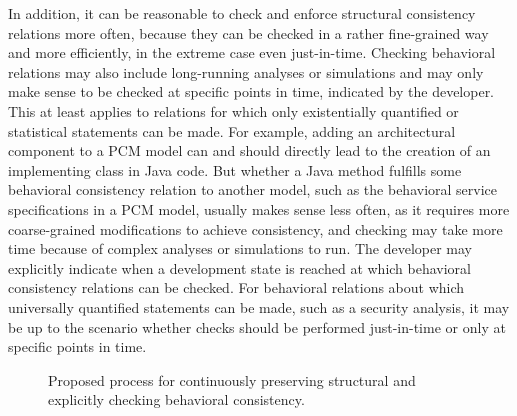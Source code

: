 In addition, it can be reasonable to check and enforce structural consistency relations more often, because they can be checked in a rather fine-grained way and more efficiently, in the extreme case even just-in-time.
Checking behavioral relations may also include long-running analyses or simulations and may only make sense to be checked at specific points in time, indicated by the developer.
This at least applies to relations for which only existentially quantified or statistical statements can be made.
For example, adding an architectural component to a \gls{PCM} model can and should directly lead to the creation of an implementing class in Java code. %
But whether a Java method fulfills some behavioral consistency relation to another model, such as the behavioral service specifications in a \gls{PCM} model, usually makes sense less often, as it requires more coarse-grained modifications to achieve consistency, and checking may take more time because of complex analyses or simulations to run.
The developer may explicitly indicate when a development state is reached at which behavioral consistency relations can be checked.
For behavioral relations about which universally quantified statements can be made, such as a security analysis, it may be up to the scenario whether checks should be performed just-in-time or only at specific points in time.

\begin{figure}
    \centering
    
    \caption[Process for preserving structural and behavioral consistency]{Proposed process for continuously preserving structural and explicitly checking behavioral consistency.}
    \label{fig:networks:process_structure_behavior}
\end{figure}

